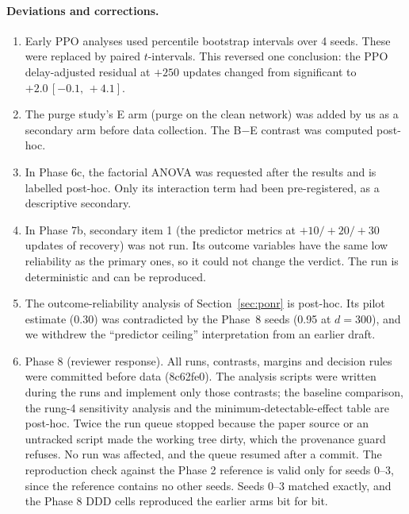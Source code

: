 \documentclass[10pt]{article} %
\newcommand{\ci}[2]{\,[#1,\,#2]}
\begin{document}
\paragraph{Deviations and corrections.}
\begin{enumerate}[label=(\arabic*)]
\item Early PPO analyses used percentile bootstrap intervals over 4 seeds. These were replaced by paired $t$-intervals. This reversed one conclusion: the PPO delay-adjusted residual at $+250$ updates changed from significant to $+2.0\ci{-0.1}{+4.1}$.
\item The purge study's E arm (purge on the clean network) was added by us as a secondary arm before data collection. The B$-$E contrast was computed post-hoc.
\item In Phase 6c, the factorial ANOVA was requested after the results and is labelled post-hoc. Only its interaction term had been pre-registered, as a descriptive secondary.
\item In Phase 7b, secondary item 1 (the predictor metrics at $+10/+20/+30$ updates of recovery) was not run. Its outcome variables have the same low reliability as the primary ones, so it could not change the verdict. The run is deterministic and can be reproduced.
\item The outcome-reliability analysis of Section~\ref{sec:ponr} is post-hoc. Its pilot estimate (0.30) was contradicted by the Phase~8 seeds (0.95 at $d=300$), and we withdrew the ``predictor ceiling'' interpretation from an earlier draft.
\item Phase 8 (reviewer response). All runs, contrasts, margins and decision rules were committed before data (8c62fe0). The analysis scripts were written during the runs and implement only those contrasts; the baseline comparison, the rung-4 sensitivity analysis and the minimum-detectable-effect table are post-hoc. Twice the run queue stopped because the paper source or an untracked script made the working tree dirty, which the provenance guard refuses. No run was affected, and the queue resumed after a commit. The reproduction check against the Phase 2 reference is valid only for seeds 0--3, since the reference contains no other seeds. Seeds 0--3 matched exactly, and the Phase 8 DDD cells reproduced the earlier arms bit for bit.

\end{enumerate}
\end{document}
